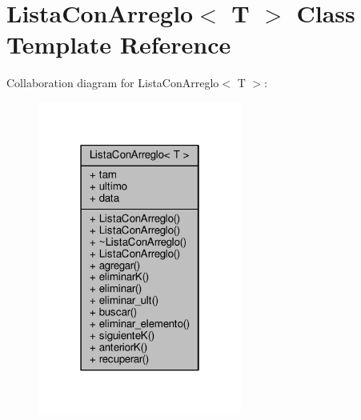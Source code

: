 \hypertarget{class_lista_con_arreglo}{\section{Lista\+Con\+Arreglo$<$ T $>$ Class Template Reference}
\label{class_lista_con_arreglo}
}


Collaboration diagram for Lista\+Con\+Arreglo$<$ T $>$\+:
\nopagebreak
\begin{figure}[H]
\begin{center}
\leavevmode
\includegraphics[width=190pt]{class_lista_con_arreglo__coll__graph}
\end{center}
\end{figure}
